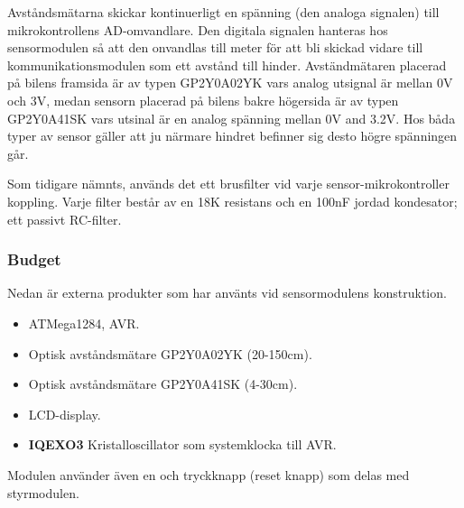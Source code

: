 \documentclass[tekniskrapport/tech.tex]{subfiles}
\begin{document}
Avståndsmätarna skickar kontinuerligt en spänning (den analoga signalen) till
mikrokontrollens AD-omvandlare. Den digitala signalen hanteras hos
sensormodulen så att den onvandlas till meter för att bli skickad vidare till
kommunikationsmodulen som ett avstånd till hinder. Avständmätaren placerad på
bilens framsida är av typen GP2Y0A02YK vars analog utsignal är mellan 0V och
3V, medan sensorn placerad på bilens bakre högersida är av typen GP2Y0A41SK
vars utsinal är en analog spänning mellan 0V and 3.2V. Hos båda typer av sensor
gäller att ju närmare hindret befinner sig desto högre spänningen går. 

Som tidigare nämnts, används det ett brusfilter vid varje
sensor-mikrokontroller koppling. Varje filter består av en 18K resistans och en
100nF jordad kondesator; ett passivt RC-filter.

\subsubsection{Budget}
Nedan är externa produkter som har använts vid sensormodulens konstruktion.
\begin{itemize}
	\item \textbf{\modMicrocontroller} ATMega1284, AVR. 
    \item \textbf{\modDistf} Optisk avståndsmätare GP2Y0A02YK (20-150cm).
    \item \textbf{\modDists} Optisk avståndsmätare GP2Y0A41SK (4-30cm).
    \item \textbf{\modLcd} LCD-display.
    \item \textbf{IQEXO3} Kristalloscillator som systemklocka till AVR.
\end{itemize}
Modulen använder även en {\modJtag} och tryckknapp (reset knapp) som delas med
styrmodulen.
\end{document}
